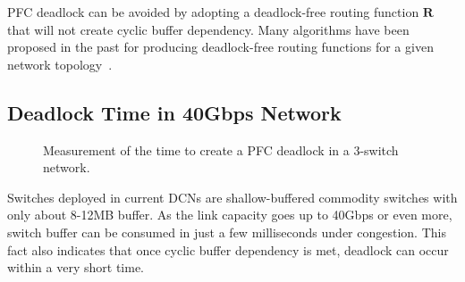 PFC deadlock can be avoided by adopting a deadlock-free routing function $\textbf{R}$ that will not create cyclic buffer dependency. Many algorithms have been proposed in the past for producing deadlock-free routing functions for a given network topology~\cite{dally,flich2012survey,tcp-bolt}.

%

\subsection{Deadlock Time in 40Gbps Network}\label{subsec:deadlocktime}

\begin{figure}[t]
	\centering
	
	\caption{Measurement of the time to create a PFC deadlock in a 3-switch network.}\label{fig:deadlocktime}
	
\end{figure}

Switches deployed in current DCNs are shallow-buffered commodity switches with only about 8-12MB buffer. As the link capacity goes up to 40Gbps or even more,  switch buffer can be consumed in just a few milliseconds under congestion. This fact also indicates that once cyclic buffer dependency is met, deadlock can occur within a very short time.

